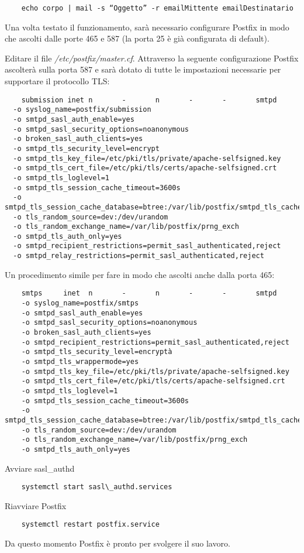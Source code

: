 \begin{verbatim}
    echo corpo | mail -s “Oggetto” -r emailMittente emailDestinatario 
\end{verbatim}

Una volta testato il funzionamento, sarà necessario configurare Postfix in modo che ascolti dalle porte 465 e 587 
(la porta 25 è già configurata di default).

Editare il file \textit{/etc/postfix/master.cf}. Attraverso la seguente configurazione Postfix ascolterà 
sulla porta 587 e sarà dotato di tutte le impostazioni necessarie per supportare il protocollo TLS:

\begin{verbatim}
    submission inet n       -       n       -       -       smtpd
  -o syslog_name=postfix/submission
  -o smtpd_sasl_auth_enable=yes
  -o smtpd_sasl_security_options=noanonymous
  -o broken_sasl_auth_clients=yes
  -o smtpd_tls_security_level=encrypt
  -o smtpd_tls_key_file=/etc/pki/tls/private/apache-selfsigned.key
  -o smtpd_tls_cert_file=/etc/pki/tls/certs/apache-selfsigned.crt
  -o smtpd_tls_loglevel=1
  -o smtpd_tls_session_cache_timeout=3600s
  -o smtpd_tls_session_cache_database=btree:/var/lib/postfix/smtpd_tls_cache
  -o tls_random_source=dev:/dev/urandom
  -o tls_random_exchange_name=/var/lib/postfix/prng_exch
  -o smtpd_tls_auth_only=yes
  -o smtpd_recipient_restrictions=permit_sasl_authenticated,reject
  -o smtpd_relay_restrictions=permit_sasl_authenticated,reject
\end{verbatim}

Un procedimento simile per fare in modo che ascolti anche dalla porta 465:

\begin{verbatim}
    smtps     inet  n       -       n       -       -       smtpd
    -o syslog_name=postfix/smtps
    -o smtpd_sasl_auth_enable=yes
    -o smtpd_sasl_security_options=noanonymous
    -o broken_sasl_auth_clients=yes
    -o smtpd_recipient_restrictions=permit_sasl_authenticated,reject
    -o smtpd_tls_security_level=encryptà
    -o smtpd_tls_wrappermode=yes
    -o smtpd_tls_key_file=/etc/pki/tls/private/apache-selfsigned.key
    -o smtpd_tls_cert_file=/etc/pki/tls/certs/apache-selfsigned.crt
    -o smtpd_tls_loglevel=1
    -o smtpd_tls_session_cache_timeout=3600s
    -o smtpd_tls_session_cache_database=btree:/var/lib/postfix/smtpd_tls_cache
    -o tls_random_source=dev:/dev/urandom
    -o tls_random_exchange_name=/var/lib/postfix/prng_exch
    -o smtpd_tls_auth_only=yes
\end{verbatim}

Avviare sasl\_authd
\begin{verbatim}
    systemctl start sasl\_authd.services
\end{verbatim}

Riavviare Postfix
\begin{verbatim}
    systemctl restart postfix.service
\end{verbatim}

Da questo momento Postfix è pronto per svolgere il suo lavoro.